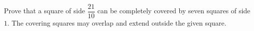 Prove that a square of side $\dfrac{21}{10}$ can be completely covered by seven squares of side $1$. The covering squares may overlap and extend outside the given square.
